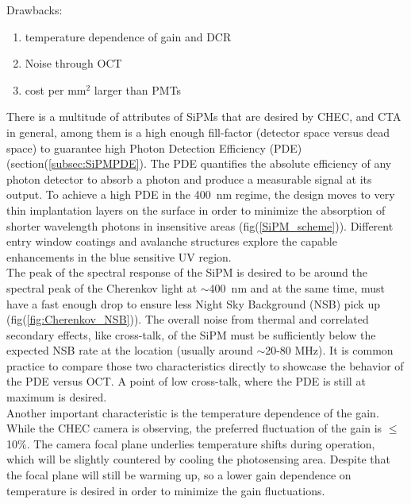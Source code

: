\documentclass[12pt,article,type=msc,colorback,accentcolor=tud9c]{tudthesis}
\begin{document}
\noindent
Drawbacks:\\
\begin{enumerate}[topsep=0pt,itemsep=-1ex,partopsep=1ex,parsep=1ex]
\item temperature dependence of gain and DCR
\item Noise through OCT
\item cost per mm$^2$ larger than PMTs
\end{enumerate}
\noindent
\newline
There is a multitude of attributes of SiPMs that are desired by CHEC, and CTA in general, among them is a high enough fill-factor (detector space versus dead space) to guarantee high Photon Detection Efficiency (PDE) (section(\ref{subsec:SiPMPDE}). The PDE quantifies the absolute efficiency of any photon detector to absorb a photon and produce a measurable signal at its output. To achieve a high PDE in the 400~nm regime, the design moves to very thin implantation layers on the surface in order to minimize the absorption of shorter wavelength photons in insensitive areas (fig(\ref{SiPM_scheme})). Different entry window coatings and avalanche structures explore the capable enhancements in the blue sensitive UV region.\\
The peak of the spectral response of the SiPM is desired to be around the spectral peak of the Cherenkov light at $\sim$400~nm and at the same time, must have a fast enough drop to ensure less Night Sky Background (NSB) pick up (fig(\ref{fig:Cherenkov_NSB})). The overall noise from thermal and correlated secondary effects, like cross-talk, of the SiPM must be sufficiently below the expected NSB rate at the location (usually around $\sim$20-80 MHz\cite{SiPMvsMAPMT}). It is common practice to compare those two characteristics directly to showcase the behavior of the PDE versus OCT. A point of low cross-talk, where the PDE is still at maximum is desired.\\
Another important characteristic is the temperature dependence of the gain. While the CHEC camera is observing, the preferred fluctuation of the gain is $\leq$10$\%$. The camera focal plane underlies temperature shifts during operation, which will be slightly countered by cooling the photosensing area. Despite that the focal plane will still be warming up, so a lower gain dependence on temperature is desired in order to minimize the gain fluctuations.
\end{document}
